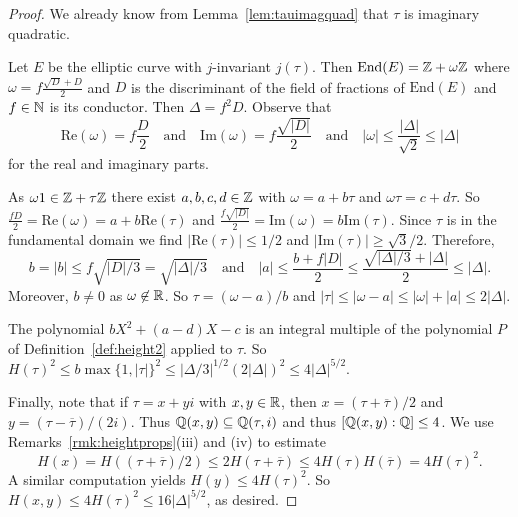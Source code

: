\begin{proof}  
  We already know from Lemma~\ref{lem:tauimagquad} that $\tau$ is
  imaginary quadratic.

  Let $E$ be the elliptic curve with $j$-invariant $j(\tau)$. Then
  $\mathrm{End}(E) = {\mathbb{Z}} + \omega {\mathbb{Z}}$ where $\omega = f
  \frac{\sqrt{D}+D}{2}$ and $D$ is the discriminant of the field of
  fractions of $\mathrm{End}(E)$ and $f\in{\mathbb{N}}$ is its conductor.  
  Then $\Delta = f^2D$. Observe that
  \begin{equation*}
    \mathrm{Re}(\omega) = f\frac{D}{2} \quad\text{and}\quad
    \mathrm{Im}(\omega) = f\frac{\sqrt{|D|}}{2}
    \quad\text{and}\quad
    |\omega| \le \frac{|\Delta|}{\sqrt{2}}\le|\Delta|
  \end{equation*}
  for the real and imaginary parts. 

  As $\omega 1 \in{\mathbb{Z}}+\tau{\mathbb{Z}}$ there exist $a,b,c,d\in{\mathbb{Z}}$ with
  $\omega=a+b\tau$ and $\omega\tau = c+d\tau$.
  So $\frac{fD}{2}=\mathrm{Re}(\omega) =
  a+b\mathrm{Re}(\tau)$ and $\frac{f\sqrt{|D|}}{2}=\mathrm{Im}(\omega)
  = b \mathrm{Im}(\tau)$. Since $\tau$ is in the fundamental domain we
  find $|\mathrm{Re}(\tau)|\le 1/2$ and $|\mathrm{Im}(\tau)|\ge
  \sqrt{3}/2$. Therefore,
  \begin{equation*}
    b=|b|\le {f \sqrt{|D|/3}} = \sqrt{|\Delta|/3}
    \quad\text{and}\quad
    |a|\le \frac{b+f|D|}{2} \le \frac{\sqrt{|\Delta|/3} +
      |\Delta|}{2} \le |\Delta|. 
  \end{equation*}
  Moreover, $b\not=0$ as $\omega\not\in{\mathbb{R}}$. So
  $\tau = (\omega-a)/b$ and $|\tau|\le
  |\omega-a|\le|\omega|+|a| \le 2|\Delta| $.

  The polynomial $bX^2+(a-d)X-c$ is an integral multiple of the
  polynomial $P$ of Definition~\ref{def:height2} applied to $\tau$.
  So $H(\tau)^2 \le b\max\{1,|\tau|\}^2 \le |\Delta/3|^{1/2}
  (2|\Delta|)^2 \le 4|\Delta|^{5/2}$.
  
  Finally, note that if $\tau=x+yi$ with $x,y\in{\mathbb{R}}$, then $x =
  (\tau+\overline\tau)/2$ and $y = (\tau-\overline \tau)/(2i)$. 
  Thus ${\mathbb{Q}}(x,y)\subseteq {\mathbb{Q}}(\tau,i)$ and thus $[{\mathbb{Q}}(x,y):{\mathbb{Q}}]\le 4$. 
  We use Remarks~\ref{rmk:heightprops}(iii) and (iv) to estimate
  \begin{equation*}
    H(x) = H((\tau+\overline\tau)/2)\le 2H(\tau+\overline\tau)\le
    4H(\tau)H(\overline\tau) = 4H(\tau)^2.
  \end{equation*}
  A similar computation yields $H(y)\le 4H(\tau)^2$. So
  $H(x,y)\le 4H(\tau)^2 \le 16 |\Delta|^{5/2}$, as desired. 
\end{proof}


